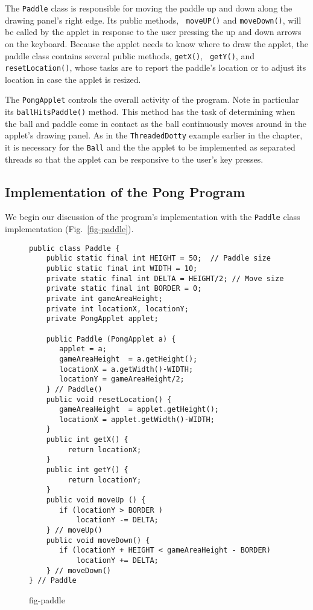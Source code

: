 The {\tt Paddle} class is responsible for moving the paddle up and
down along the drawing panel's right edge. Its public methods, {\tt
moveUP()} and {\tt moveDown()},  will be called by the applet in
response to the user pressing the up and down arrows on the
keyboard.  Because the applet needs to know where to draw the applet,
the paddle class contains several public methods, {\tt getX()}, {\tt
getY()}, and {\tt resetLocation()}, whose tasks are to report the
paddle's location or to adjust its location in case the applet
is resized.

The {\tt PongApplet} controls the overall activity of the program.
Note in particular its {\tt ballHitsPaddle()} method. This method has
the task of determining when the ball and paddle come in contact as
the ball continuously moves around in the applet's drawing panel.  As
in the {\tt ThreadedDotty} example earlier in the chapter, it is
necessary for the {\tt Ball} and the the applet to be implemented as
separated threads so that the applet can be responsive to the user's
key presses.

\subsection{Implementation of the Pong Program}

We begin our discussion of the program's implementation with the {\tt Paddle} class
implementation (Fig.~\ref{fig-paddle}).
\begin{figure}[htb]
\jjjprogstart
\begin{jjjlisting}[27pc]
\begin{lstlisting}
public class Paddle {
    public static final int HEIGHT = 50;  // Paddle size
    public static final int WIDTH = 10;       
    private static final int DELTA = HEIGHT/2; // Move size
    private static final int BORDER = 0;
    private int gameAreaHeight;
    private int locationX, locationY;
    private PongApplet applet;

    public Paddle (PongApplet a) {
       applet = a;
       gameAreaHeight  = a.getHeight();
       locationX = a.getWidth()-WIDTH;
       locationY = gameAreaHeight/2;
    } // Paddle()
    public void resetLocation() {
       gameAreaHeight  = applet.getHeight();
       locationX = applet.getWidth()-WIDTH;
    }
    public int getX() {
         return locationX;
    }
    public int getY() {
         return locationY;
    }
    public void moveUp () {
       if (locationY > BORDER )
           locationY -= DELTA;
    } // moveUp()
    public void moveDown() {
       if (locationY + HEIGHT < gameAreaHeight - BORDER)
           locationY += DELTA;
    } // moveDown()
} // Paddle
\end{lstlisting}
\end{jjjlisting}
{fig-paddle}
\end{figure}

